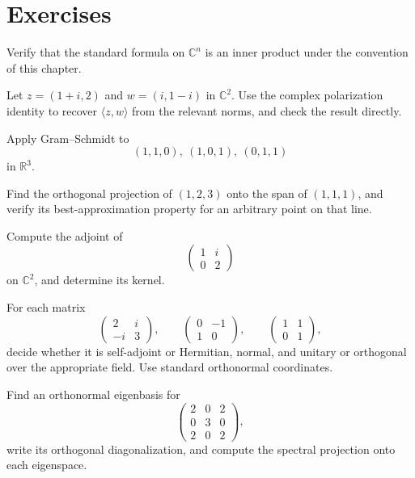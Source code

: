 \section*{Exercises}
\begin{exercise}[Basic] Verify that the standard formula on \(\mathbb C^n\)
is an inner product under the convention of this chapter.\end{exercise}
\begin{exercise}[Core] Let \(z=(1+i,2)\) and \(w=(i,1-i)\) in \(\mathbb C^2\).
Use the complex polarization identity to recover \(\langle z,w\rangle\) from
the relevant norms, and check the result directly.\end{exercise}
\begin{exercise}[Core] Apply Gram--Schmidt to
\[
(1,1,0),\ (1,0,1),\ (0,1,1)
\]
in \(\mathbb R^3\).\end{exercise}
\begin{exercise}[Core] Find the orthogonal projection of \((1,2,3)\) onto
the span of \((1,1,1)\), and verify its best-approximation property for an
arbitrary point on that line.\end{exercise}
\begin{exercise}[Core] Compute the adjoint of
\[
\begin{pmatrix}1&i\\0&2\end{pmatrix}
\]
on \(\mathbb C^2\), and determine its kernel.\end{exercise}
\begin{exercise}[Core] For each matrix
\[
\begin{pmatrix}2&i\\-i&3\end{pmatrix},\qquad
\begin{pmatrix}0&-1\\1&0\end{pmatrix},\qquad
\begin{pmatrix}1&1\\0&1\end{pmatrix},
\]
decide whether it is self-adjoint or Hermitian, normal, and unitary or
orthogonal over the appropriate field.  Use standard orthonormal
coordinates.\end{exercise}
\begin{exercise}[Core] Find an orthonormal eigenbasis for
\[
\begin{pmatrix}2&0&2\\0&3&0\\2&0&2\end{pmatrix},
\]
write its orthogonal diagonalization, and compute the spectral projection
onto each eigenspace.\end{exercise}
